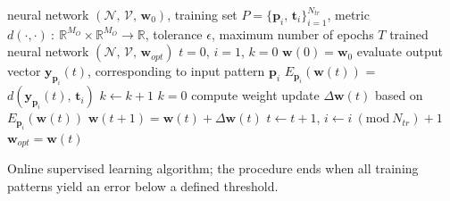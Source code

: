 \documentclass[12pt, a4paper, twoside, openright, notitlepage]{report}
\numberwithin{equation}{chapter}
\theoremstyle{theorem}
\theoremstyle{definition}
\theoremstyle{remark}
\theoremstyle{proposition}
\numberwithin{figure}{chapter}
\newcommand{\Mod}[1]{\ (\mathrm{mod}\ #1)}
\begin{document}
		\begin{algorithm}[t]
			\begin{algorithmic}[1]
				\Require neural network $\left( \mathcal{N}, \, \mathcal{V}, \, \mathbf{w}_0 \right)$, training set $P = \big\lbrace \mathbf{p}_i, \, \mathbf{t}_i \big\rbrace_{i = 1}^{N_{tr}}$, 
				\Statex \hspace*{0.535cm} metric $d(\cdot,\cdot) ~ : ~ \mathbb{R}^{M_O} \times \mathbb{R}^{M_O} \rightarrow \mathbb{R}$, tolerance $\epsilon$, maximum number of epochs $T$
				\Ensure trained neural network $\left( \mathcal{N}, \, \mathcal{V}, \, \mathbf{w}_{opt} \right)$
				\vspace*{0.2cm}
				\State $t = 0$, $i = 1$, $k = 0$
				\State $\mathbf{w}(0) = \mathbf{w}_0$
					\State evaluate output vector $\mathbf{y}_{\mathbf{p}_i}(t)$, corresponding to input pattern $\mathbf{p}_i$
					\State $E_{\mathbf{p}_i}(\mathbf{w}(t))$ = $d(\mathbf{y}_{\mathbf{p}_i}(t), \, \mathbf{t}_i)$
						\State $k \leftarrow k + 1$
					\Else
						\State $k = 0$
						\State compute weight update $\Delta \mathbf{w}(t)$ based on $E_{\mathbf{p}_i}(\mathbf{w}(t))$
						\State $\mathbf{w}(t+1) = \mathbf{w}(t) + \Delta \mathbf{w}(t)$
					\EndIf
					\State $t \leftarrow t+1$, $i \leftarrow i \Mod{N_{tr}} + 1$					
				\EndWhile		
				\State $\mathbf{w}_{opt} = \mathbf{w}(t)$
			\end{algorithmic}
			
			\caption{Online supervised learning algorithm; the procedure ends when all training patterns yield an error below a defined threshold.}
			\label{alg:online-learning}
		\end{algorithm}
\end{document}
